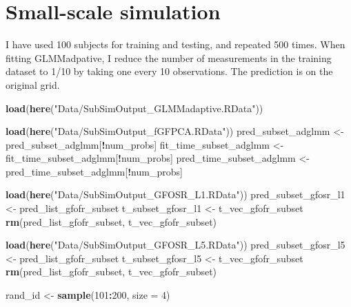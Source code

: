 \documentclass[
]{article}
\newenvironment{Shaded}{\begin{snugshade}}{\end{snugshade}}
\newcommand{\AttributeTok}[1]{\textcolor[rgb]{0.13,0.29,0.53}{#1}}
\newcommand{\DecValTok}[1]{\textcolor[rgb]{0.00,0.00,0.81}{#1}}
\newcommand{\FunctionTok}[1]{\textcolor[rgb]{0.13,0.29,0.53}{\textbf{#1}}}
\newcommand{\NormalTok}[1]{#1}
\newcommand{\OtherTok}[1]{\textcolor[rgb]{0.56,0.35,0.01}{#1}}
\newcommand{\SpecialCharTok}[1]{\textcolor[rgb]{0.81,0.36,0.00}{\textbf{#1}}}
\newcommand{\StringTok}[1]{\textcolor[rgb]{0.31,0.60,0.02}{#1}}
\begin{document}
\section{Small-scale simulation}\label{small-scale-simulation}

I have used 100 subjects for training and testing, and repeated 500
times. When fitting GLMMadpative, I reduce the number of measurements in
the training dataset to 1/10 by taking one every 10 observations. The
prediction is on the original grid.

\begin{Shaded}
\begin{Highlighting}[]
\FunctionTok{load}\NormalTok{(}\FunctionTok{here}\NormalTok{(}\StringTok{"Data/SubSimOutput\_GLMMadaptive.RData"}\NormalTok{))}

\FunctionTok{load}\NormalTok{(}\FunctionTok{here}\NormalTok{(}\StringTok{"Data/SubSimOutput\_fGFPCA.RData"}\NormalTok{))}
\NormalTok{pred\_subset\_adglmm }\OtherTok{\textless{}{-}}\NormalTok{ pred\_subset\_adglmm[}\SpecialCharTok{!}\NormalTok{num\_probs]}
\NormalTok{fit\_time\_subset\_adglmm }\OtherTok{\textless{}{-}}\NormalTok{ fit\_time\_subset\_adglmm[}\SpecialCharTok{!}\NormalTok{num\_probs]}
\NormalTok{pred\_time\_subset\_adglmm }\OtherTok{\textless{}{-}}\NormalTok{ pred\_time\_subset\_adglmm[}\SpecialCharTok{!}\NormalTok{num\_probs]}

\FunctionTok{load}\NormalTok{(}\FunctionTok{here}\NormalTok{(}\StringTok{"Data/SubSimOutput\_GFOSR\_L1.RData"}\NormalTok{))}
\NormalTok{pred\_subset\_gfosr\_l1 }\OtherTok{\textless{}{-}}\NormalTok{ pred\_list\_gfofr\_subset}
\NormalTok{t\_subset\_gfosr\_l1 }\OtherTok{\textless{}{-}}\NormalTok{ t\_vec\_gfofr\_subset}
\FunctionTok{rm}\NormalTok{(pred\_list\_gfofr\_subset, t\_vec\_gfofr\_subset)}

\FunctionTok{load}\NormalTok{(}\FunctionTok{here}\NormalTok{(}\StringTok{"Data/SubSimOutput\_GFOSR\_L5.RData"}\NormalTok{))}
\NormalTok{pred\_subset\_gfosr\_l5 }\OtherTok{\textless{}{-}}\NormalTok{ pred\_list\_gfofr\_subset}
\NormalTok{t\_subset\_gfosr\_l5 }\OtherTok{\textless{}{-}}\NormalTok{ t\_vec\_gfofr\_subset}
\FunctionTok{rm}\NormalTok{(pred\_list\_gfofr\_subset, t\_vec\_gfofr\_subset)}

\NormalTok{rand\_id }\OtherTok{\textless{}{-}} \FunctionTok{sample}\NormalTok{(}\DecValTok{101}\SpecialCharTok{:}\DecValTok{200}\NormalTok{, }\AttributeTok{size =} \DecValTok{4}\NormalTok{)}
\end{Highlighting}
\end{Shaded}
\end{document}

